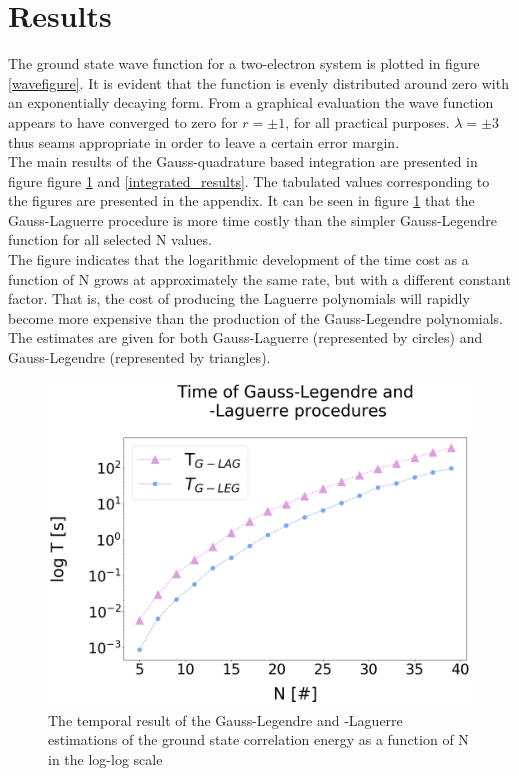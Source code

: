 \documentclass[%
reprint,nofootinbib,
amsmath,amssymb,
aps,
]{revtex4-1}
\begin{document}
\section{Results}  \noindent
The ground state wave function for a two-electron system is plotted in figure \ref{wavefigure}. It is evident that the function is evenly distributed around zero with an exponentially decaying form. From a graphical evaluation the wave function appears to have converged to zero for $r = \pm 1$, for all practical purposes. $\lambda = \pm 3$ thus seams appropriate in order to leave a certain error margin. \\ \indent 
The main results of the Gauss-quadrature based integration are presented in figure figure \ref{integrated_time_l} and \ref{integrated_results}. The tabulated values corresponding to the figures are presented in the appendix. It can be seen in figure \ref{integrated_time_l} that the Gauss-Laguerre procedure is more time costly than the simpler Gauss-Legendre function for all selected N values.\\ \indent The figure indicates that the logarithmic development of the time cost as a function of N grows at approximately the same rate, but with a different constant factor. That is, the cost of producing the Laguerre polynomials will rapidly become more expensive than the production of the Gauss-Legendre polynomials. The estimates are given for both Gauss-Laguerre (represented by circles) and  Gauss-Legendre (represented by triangles).
\begin{figure}[!hb]
	\includegraphics[width=\columnwidth]{Gauss_time.png}
	\caption{\label{integrated_time_l} The temporal result of the Gauss-Legendre and -Laguerre estimations of the ground state correlation energy as a function of N in the log-log scale }
\end{figure} 
\end{document}

